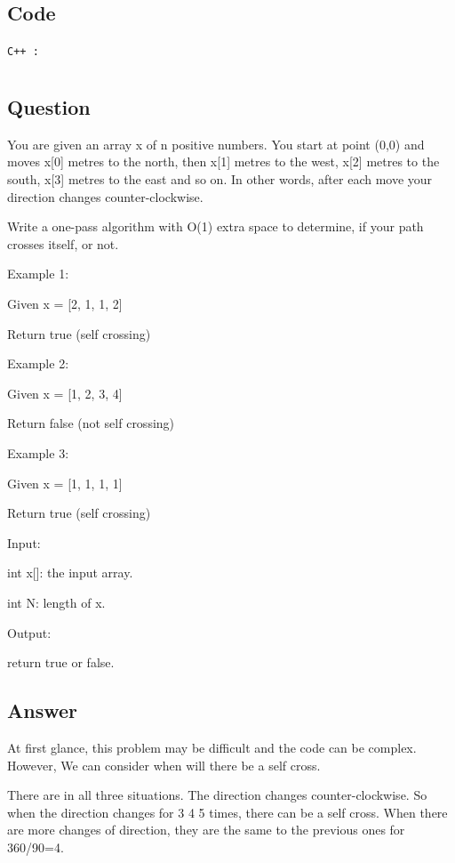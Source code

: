 \subsection{Code}
\texttt{C++ :}


\newpage
\section{}
\subsection{Question}
You are given an array x of n positive numbers. You start at point (0,0) and moves x[0] metres to the north, then x[1] metres to the west, x[2] metres to the south, x[3] metres to the east and so on. In other words, after each move your direction changes counter-clockwise.

Write a one-pass algorithm with O(1) extra space to determine, if your path crosses itself, or not.

Example 1:

Given x = [2, 1, 1, 2]

Return true (self crossing)

Example 2:

Given x = [1, 2, 3, 4]

Return false (not self crossing)

Example 3:

Given x = [1, 1, 1, 1]

Return true (self crossing)

Input:

int x[]: the input array.

int N: length of x.

Output:

return true or false.

\subsection{Answer}

At first glance, this problem may be difficult and the code can be complex. However, We can consider when will there be a self cross.

There are in all three situations. The direction changes counter-clockwise. So when the direction changes for 3 4 5 times, there can be a self cross. When there are more changes of direction, they are the same to the previous ones for 360/90=4.

